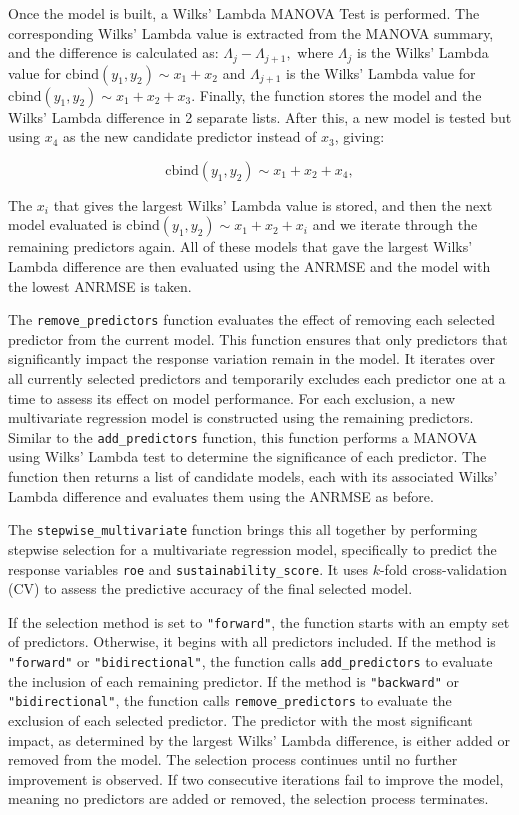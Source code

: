 Once the model is built, a Wilks' Lambda MANOVA Test is performed. The corresponding Wilks' Lambda value is extracted from the MANOVA summary, and the difference is calculated as:
$
\Lambda_{j} - \Lambda_{j+1},
$
\noindent where $\Lambda_{j}$ is the Wilks' Lambda value for $\text{cbind}(y_1, y_2) \sim x_1 + x_2$ and $\Lambda_{j+1}$ is the Wilks' Lambda value for $\text{cbind}(y_1, y_2) \sim x_1 + x_2 + x_3$. Finally, the function stores the model and the Wilks' Lambda difference in 2 separate lists. After this, a new model is tested but using $x_4$ as the new candidate predictor instead of $x_3$, giving:

\[
\text{cbind}(y_1, y_2) \sim x_1 + x_2 + x_4,
\]

The $x_i$ that gives the largest Wilks' Lambda value is stored, and then the next model evaluated is $\text{cbind}(y_1, y_2) \sim x_1 + x_2 + x_i$ and we iterate through the remaining predictors again. All of these models that gave the largest Wilks' Lambda difference are then evaluated using the ANRMSE and the model with the lowest ANRMSE is taken.

The \texttt{remove\_predictors} function evaluates the effect of removing each selected predictor from the current model. This function ensures that only predictors that significantly impact the response variation remain in the model. It iterates over all currently selected predictors and temporarily excludes each predictor one at a time to assess its effect on model performance. For each exclusion, a new multivariate regression model is constructed using the remaining predictors. Similar to the \texttt{add\_predictors} function, this function performs a MANOVA using Wilks' Lambda test to determine the significance of each predictor. The function then returns a list of candidate models, each with its associated Wilks' Lambda difference and evaluates them using the ANRMSE as before.


The \texttt{stepwise\_multivariate} function brings this all together by performing stepwise selection for a multivariate regression model, specifically to predict the response variables \texttt{roe} and \texttt{sustainability\linebreak\_score}. It uses $k$-fold cross-validation (CV) to assess the predictive accuracy of the final selected model.

If the selection method is set to \texttt{"forward"}, the function starts with an empty set of predictors. Otherwise, it begins with all predictors included. If the method is \texttt{"forward"} or \texttt{"bidirectional"}, the function calls \texttt{add\_predictors} to evaluate the inclusion of each remaining predictor. If the method is \texttt{"backward"} or \texttt{"bidirectional"}, the function calls \texttt{remove\_predictors} to evaluate the exclusion of each selected predictor. The predictor with the most significant impact, as determined by the largest Wilks' Lambda difference, is either added or removed from the model. The selection process continues until no further improvement is observed. If two consecutive iterations fail to improve the model, meaning no predictors are added or removed, the selection process terminates.

